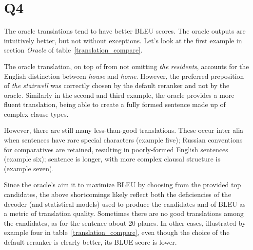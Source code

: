 \section*{Q4}

The oracle translations tend to have better BLEU scores. The oracle outputs are intuitively better, but not without exceptions. Let's look at the first example in section \textit{Oracle} of table~\ref{translation_compare}.
  
The oracle translation, on top of from not omitting \textit{the residents}, accounts for the English distinction between \textit{house} and \textit{home}. However, the preferred preposition of \textit{the stairwell} was correctly chosen by the default reranker and not by the oracle.
Similarly in the second and third example, the oracle provides a more fluent translation, being able to create a fully formed sentence made up of complex clause types.

However, there are still many less-than-good translations. These occur inter alia when sentences have rare special characters (example five); Russian conventions for comparatives are retained, resulting in poorly-formed English sentences (example six); sentence is longer, with more complex clausal structure is (example seven).

Since the oracle's aim it to maximize BLEU by choosing from the provided top candidates, the above shortcomings likely reflect both the deficiencies of the decoder (and statistical models) used to produce the candidates and of BLEU as a metric of translation quality. Sometimes there are no good translations among the candidates, as for the sentence about 20 planes. In other cases, illustrated by example four in table~\ref{translation_compare}, even though the choice of the default reranker is clearly better, its BLUE score is lower.


